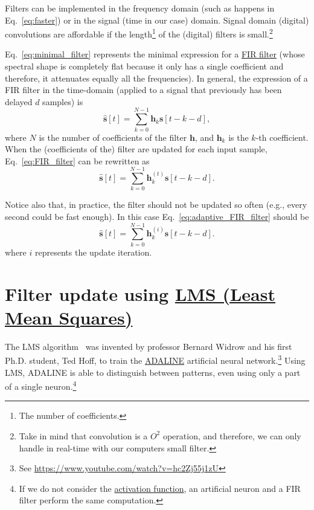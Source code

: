Filters can be implemented in the frequency domain (such as happens in
Eq.~\eqref{eq:faster}) or in the signal (time in our case)
domain. Signal domain (digital) convolutions are affordable if the
length\footnote{The number of coefficients.} of the (digital) filters
is small.\footnote{Take in mind that convolution is a $O^2$ operation,
  and therefore, we can only handle in real-time with our computers
  small filter.}

Eq.~\eqref{eq:minimal_filter} represents the minimal expression for a
\href{https://en.wikipedia.org/wiki/Finite_impulse_response}{FIR
  filter} (whose spectral shape is completely flat because it only has
a single coefficient and therefore, it attenuates equally all the
frequencies). In general, the expression of a FIR filter in the
time-domain (applied to a signal that previously has been delayed $d$
samples) is
\begin{equation}
  \hat{\mathbf s}[t] = \sum_{k=0}^{N-1}{\mathbf h}_k{\mathbf s}[t-k-d],
  \label{eq:FIR_filter}
\end{equation}
where $N$ is the number of coefficients of the filter ${\mathbf h}$,
and ${\mathbf h}_k$ is the $k$-th coefficient. When the (coefficients
of the) filter are updated for each input sample,
Eq.~\eqref{eq:FIR_filter} can be rewritten as
\begin{equation}
  \hat{\mathbf s}[t] = \sum_{k=0}^{N-1}{\mathbf h}_k^{(t)}{\mathbf s}[t-k-d].
  \label{eq:adaptive_FIR_filter}
\end{equation}

Notice also that, in practice, the filter should not be updated so
often (e.g., every second could be fast enough). In this case
Eq.~\eqref{eq:adaptive_FIR_filter} should be
\begin{equation}
  \hat{\mathbf s}[t] = \sum_{k=0}^{N-1}{\mathbf h}_k^{(i)}{\mathbf s}[t-k-d].
  \label{eq:adaptive_FIR_filter_second}
\end{equation}
where $i$ represents the update iteration.

\section{Filter update using \href{https://en.wikipedia.org/wiki/Least_mean_squares_filter}{LMS (Least Mean Squares)}}

The LMS algorithm~\cite{haykin1995adaptive,boyd2004convex} was
invented by professor Bernard Widrow and his first Ph.D. student, Ted
Hoff, to train the
\href{https://en.wikipedia.org/wiki/ADALINE}{ADALINE} artificial
neural network.\footnote{See
  \url{https://www.youtube.com/watch?v=hc2Zj55j1zU}} Using LMS,
ADALINE is able to distinguish between patterns, even using only a
part of a single neuron.\footnote{If we do not consider the
  \href{https://en.wikipedia.org/wiki/Activation_function}{activation
    function}, an artificial neuron and a FIR filter perform the same
  computation.}

